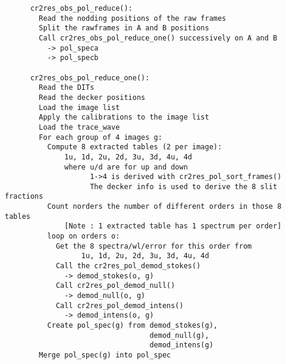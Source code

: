 \begin{verbatim}
      cr2res_obs_pol_reduce():                                            
        Read the nodding positions of the raw frames                      
        Split the rawframes in A and B positions                          
        Call cr2res_obs_pol_reduce_one() successively on A and B          
          -> pol_speca                                                    
          -> pol_specb                                                    
                                                                          
      cr2res_obs_pol_reduce_one():                                        
        Read the DITs                                                     
        Read the decker positions                                         
        Load the image list                                               
        Apply the calibrations to the image list                          
        Load the trace_wave                                               
        For each group of 4 images g:                                     
          Compute 8 extracted tables (2 per image):                       
              1u, 1d, 2u, 2d, 3u, 3d, 4u, 4d                              
              where u/d are for up and down                               
                    1->4 is derived with cr2res_pol_sort_frames()         
                    The decker info is used to derive the 8 slit fractions
          Count norders the number of different orders in those 8 tables  
              [Note : 1 extracted table has 1 spectrum per order]         
          loop on orders o:                                               
            Get the 8 spectra/wl/error for this order from                
                  1u, 1d, 2u, 2d, 3u, 3d, 4u, 4d                          
            Call the cr2res_pol_demod_stokes()                            
              -> demod_stokes(o, g)                                       
            Call cr2res_pol_demod_null()                                  
              -> demod_null(o, g)                                         
            Call cr2res_pol_demod_intens()                                
              -> demod_intens(o, g)                                       
          Create pol_spec(g) from demod_stokes(g),                        
                                  demod_null(g),                          
                                  demod_intens(g)                         
        Merge pol_spec(g) into pol_spec                                   
                                                                          

\end{verbatim}
